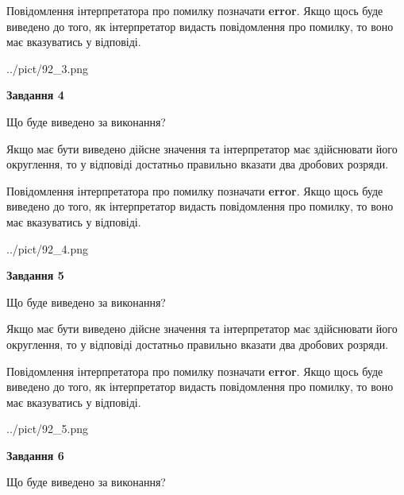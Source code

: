 \documentclass[12pt, ukrainian]{article}
\begin{document}
{\begin {Large}
Повідомлення інтерпретатора про помилку позначати \textbf{error}.
Якщо щось буде виведено до того, як інтерпретатор видасть повідомлення про помилку, 
то воно має вказуватись у відповіді. \par

\begin{center}
	{../pict/92_3.png}
\end{center}
\newpage

{\begin {center}\textbf{Завдання 4}\end {center}}\par
Що буде виведено за виконання? \par

Якщо має бути виведено дійсне значення та інтерпретатор має здійснювати його округлення, 
то у відповіді достатньо правильно вказати два дробових розряди.

Повідомлення інтерпретатора про помилку позначати \textbf{error}.
Якщо щось буде виведено до того, як інтерпретатор видасть повідомлення про помилку, 
то воно має вказуватись у відповіді. \par

\begin{center}
	{../pict/92_4.png}
\end{center}
\newpage

{\begin {center}\textbf{Завдання 5}\end {center}}\par
Що буде виведено за виконання? \par

Якщо має бути виведено дійсне значення та інтерпретатор має здійснювати його округлення, 
то у відповіді достатньо правильно вказати два дробових розряди.

Повідомлення інтерпретатора про помилку позначати \textbf{error}.
Якщо щось буде виведено до того, як інтерпретатор видасть повідомлення про помилку, 
то воно має вказуватись у відповіді. \par

\begin{center}
	{../pict/92_5.png}
\end{center}
\newpage

{\begin {center}\textbf{Завдання 6}\end {center}}\par
Що буде виведено за виконання? \par


\end{Large}}
\end{document}
